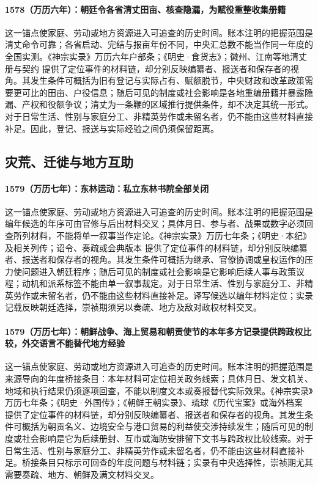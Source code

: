 \paragraph{1578（万历六年）：朝廷令各省清丈田亩、核查隐漏，为赋役重整收集册籍} 这一锚点使家庭、劳动或地方资源进入可追查的历史时间。账本注明的把握范围是清丈命令可靠；各省启动、完结与报亩年份不同，中央汇总数不能当作同一年度的全国实测。《神宗实录》万历六年户部条；《明史·食货志》；徽州、江南等地清丈册与契约 提供了定位事件的材料链，却分别反映编纂者、报送者和保存者的视角。其发生条件可概括为旧有登记与实际占有、赋额脱节，中央财政和改革政策需要更可比的田亩、户役信息；随后可见的制度或社会影响是各地重编册籍并暴露隐漏、产权和役额争议；清丈为一条鞭的区域推行提供条件，却不决定其统一形式。对于日常生活、性别与家庭分工、非精英劳作或未留名者，仍不能由这些材料直接补足。因此，登记、报送与实际经验之间仍须保留距离。

\subsection{灾荒、迁徙与地方互助}

\paragraph{1579（万历七年）：东林运动：私立东林书院全部关闭} 这一锚点使家庭、劳动或地方资源进入可追查的历史时间。账本注明的把握范围是编年候选的年序可由官修与后出材料交叉；具体月日、参与者、战果或数字必须回查所列材料，不能将单一叙事当作定论。《神宗实录》万历七年条；《明史·本纪》及相关列传；诏令、奏疏或会典版本 提供了定位事件的材料链，却分别反映编纂者、报送者和保存者的视角。其发生条件可概括为继承、官僚协调或皇权运作的压力使问题进入朝廷程序；随后可见的制度或社会影响是它影响后续人事与政策议程；动机和派系标签不能由单一叙事裁定。对于日常生活、性别与家庭分工、非精英劳作或未留名者，仍不能由这些材料直接补足。译写候选以编年材料定位；实录记载反映朝廷选择，崇祯期须另以奏疏、地方及敌对政权材料交叉。

\paragraph{1579（万历七年）：朝鲜战争、海上贸易和朝贡使节的本年多方记录提供跨政权比较，外交语言不能替代地方经验} 这一锚点使家庭、劳动或地方资源进入可追查的历史时间。账本注明的把握范围是来源导向的年度桥接条目：本年材料可定位相关政务线索；具体月日、发文机关、地域和执行结果仍须逐项回查，不能以制度文本或奏报替代实际效果。《神宗实录》万历七年条；《明史·外国传》；《朝鲜王朝实录》、琉球《历代宝案》或海外档案 提供了定位事件的材料链，却分别反映编纂者、报送者和保存者的视角。其发生条件可概括为朝贡名义、边境安全与港口贸易的利益使交涉持续发生；随后可见的制度或社会影响是它为后续册封、互市或海防安排留下文书与跨政权比较线索。对于日常生活、性别与家庭分工、非精英劳作或未留名者，仍不能由这些材料直接补足。桥接条目只标示可回查的年度问题与材料链；实录有中央选择性，崇祯期尤其需要奏疏、地方、朝鲜及满文材料交叉。

